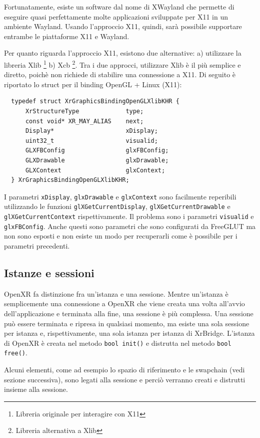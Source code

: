 \documentclass[twoside]{supsistudent}
\begin{document}
Fortunatamente, esiste un software dal nome di XWayland che permette di eseguire quasi perfettamente molte applicazioni sviluppate per X11 in un ambiente Wayland. Usando l'approccio X11, quindi, sarà possibile supportare entrambe le piattaforme X11 e Wayland.

Per quanto riguarda l'approccio X11, esistono due alternative: a) utilizzare la libreria Xlib \footnote{Libreria originale per interagire con X11} b) Xcb \footnote{Libreria alternativa a Xlib}. Tra i due approcci, utilizzare Xlib è il più semplice e diretto, poichè non richiede di stabilire una connessione a X11. Di seguito è riportato lo struct per il binding OpenGL + Linux (X11):

\begin{verbatim}
  typedef struct XrGraphicsBindingOpenGLXlibKHR {
      XrStructureType             type;
      const void* XR_MAY_ALIAS    next;
      Display*                    xDisplay;
      uint32_t                    visualid;
      GLXFBConfig                 glxFBConfig;
      GLXDrawable                 glxDrawable;
      GLXContext                  glxContext;
  } XrGraphicsBindingOpenGLXlibKHR;
\end{verbatim}

I parametri \texttt{xDisplay}, \texttt{glxDrawable} e \texttt{glxContext} sono facilmente reperibili utilizzando le funzioni \texttt{glXGetCurrentDisplay}, \texttt{glXGetCurrentDrawable} e \texttt{glXGetCurrentContext} rispettivamente. Il problema sono i parametri \texttt{visualid} e \texttt{glxFBConfig}. Anche questi sono parametri che sono configurati da FreeGLUT ma non sono esposti e non esiste un modo per recuperarli come è possibile per i parametri precedenti.

\subsection{Istanze e sessioni}

OpenXR fa distinzione fra un'istanza e una sessione. Mentre un'istanza è semplicemente una connessione a OpenXR che viene creata una volta all'avvio dell'applicazione e terminata alla fine, una sessione è più complessa. Una sessione può essere terminata e ripresa in qualsiasi momento, ma esiste una sola sessione per istanza e, rispettivamente, una sola istanza per istanza di XrBridge. L'istanza di OpenXR è creata nel metodo \texttt{bool init()} e distrutta nel metodo \texttt{bool free()}.

Alcuni elementi, come ad esempio lo spazio di riferimento e le swapchain (vedi sezione successiva), sono legati alla sessione e perciò verranno creati e distrutti insieme alla sessione.
\end{document}
